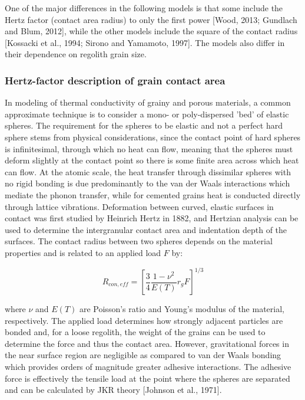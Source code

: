 \documentclass[11pt]{article} %
\begin{document}
	
	One of the major differences in the following models is that some include the Hertz factor (contact area radius) to only the first power [Wood, 2013; Gundlach and Blum, 2012], while the other models include the square of the contact radius [Kossacki et al., 1994; Sirono and Yamamoto, 1997]. The models also differ in their dependence on regolith grain size. 

\subsubsection{Hertz-factor description of grain contact area}
	In modeling of thermal conductivity of grainy and porous materials, a common approximate technique is to consider a mono- or poly-dispersed 'bed' of elastic spheres. The requirement for the spheres to be elastic and not a perfect hard sphere stems from physical considerations, since the contact point of hard spheres is infinitesimal, through which no heat can flow, meaning that the spheres must deform slightly at the contact point so there is some finite area across which heat can flow. At the atomic scale, the heat transfer through dissimilar spheres with no rigid bonding is due predominantly to the van der Waals interactions which mediate the phonon transfer, while for cemented grains heat is conducted directly through lattice vibrations. Deformation between curved, elastic surfaces in contact was first studied by Heinrich Hertz in 1882, and Hertzian analysis can be used to determine the intergranular contact area and indentation depth of the surfaces. The contact radius between two spheres depends on the material properties and is related to an applied load $F$ by:

	\begin{equation}
	R_{con,eff} = \left[ \frac{3}{4} \frac{1 - \nu^{2}}{E(T)} r_{g} F \right]^{1/3}
	\end{equation}

	where $\nu$ and $E(T)$ are Poisson's ratio and Young's modulus of the material, respectively. The applied load determines how strongly adjacent particles are bonded and, for a loose regolith, the weight of the grains can be used to determine the force and thus the contact area. However, gravitational forces in the near surface region are negligible as compared to van der Waals bonding which provides orders of magnitude greater adhesive interactions. The adhesive force is effectively the tensile load at the point where the spheres are separated and can be calculated by JKR theory [Johnson et al., 1971].
	 
\end{document}
